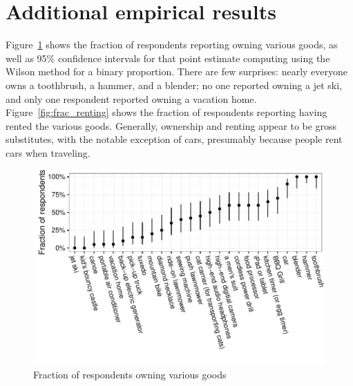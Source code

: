 \documentclass[11pt]{article}
\begin{document}
\section{Additional empirical results} \label{sec:additional_results}

Figure~\ref{fig:frac_owning} shows the fraction of respondents reporting owning various goods, as well as 95\% confidence intervals for that point estimate computing using the Wilson method for a binary proportion.    
There are few surprises: nearly everyone owns a toothbrush, a hammer, and a blender; no one reported owning a jet ski, and only one respondent reported owning a vacation home.
Figure~\ref{fig:frac_renting} shows the fraction of respondents reporting having rented the various goods. 
Generally, ownership and renting appear to be gross substitutes, with the notable exception of cars, presumably because people rent cars when traveling.

\begin{figure}
\centering 
\caption{Fraction of respondents owning various goods \label{fig:frac_owning} }
\begin{minipage}{0.90 \linewidth}
\includegraphics[width = \linewidth]{./plots/ownership_fractions.pdf} 
\end{minipage} 
\end{figure} 
\end{document}
